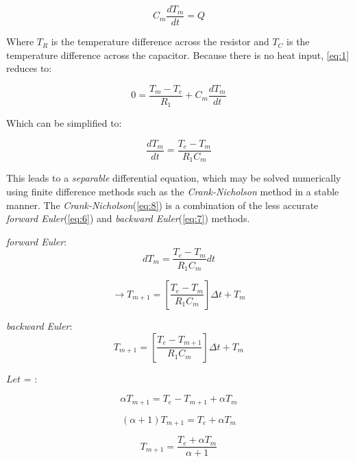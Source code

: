 \begin{equation} \label{eq:3}
C_m \frac{dT_m}{dt} = Q
\end{equation}

Where $T_R$ is the temperature difference across the resistor and $T_C$ is the temperature difference across the capacitor. Because there is no heat input, \ref{eq:1} reduces to:

\begin{equation} \label{eq:4}
0 = \frac{T_m-T_e}{R_1} + C_m \frac{dT_m}{dt}
\end{equation}

Which can be simplified to:

\begin{equation} \label{eq:5}
\frac{dT_m}{dt} = \frac{T_e-T_m}{R_1 C_m}
\end{equation}

This leads to a \textit{separable} differential equation, which may be solved numerically using finite difference methods such as the \textit{Crank-Nicholson} method in a stable manner. The \textit{Crank-Nicholson}(\ref{eq:8}) is a combination of the less accurate \textit{forward Euler}(\ref{eq:6}) and \textit{backward Euler}(\ref{eq:7}) methods.

\textit{forward Euler}:
\begin{equation*}
{dT_m} = \frac{T_e-T_m}{R_1 C_m} {dt}
\end{equation*}

\begin{equation}\label{eq:6}
\rightarrow T_{m+1} = \left[\frac{T_e-T_m}{R_1 C_m}\right] \Delta{t} + T_m
\end{equation}

\textit{backward Euler}:
\begin{equation*}
T_{m+1} = \left[\frac{T_e-T_{m+1}}{R_1 C_m}\right] \Delta{t} + T_m
\end{equation*}

$Let$ \alpha =  : 

\begin{equation*}
\alpha T_{m+1} = T_e-T_{m+1} + \alpha T_m 
\end{equation*}

\begin{equation*}
(\alpha+1) T_{m+1} = T_e + \alpha T_m 
\end{equation*}

\begin{equation*}
T_{m+1} = \frac{T_e + \alpha T_m}{\alpha+1} 
\end{equation*}

